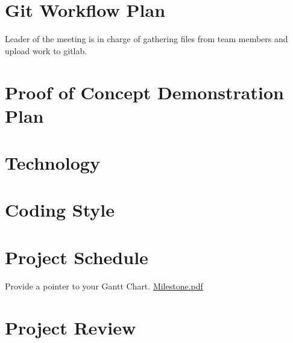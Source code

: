 \documentclass{article}
\begin{document}
\section{Git Workflow Plan}
    Leader of the meeting is in charge of gathering files from team members and upload work to gitlab.\\
    \graphicspath{ {./GitWorkFlow.png} } 
\section{Proof of Concept Demonstration Plan}

\section{Technology}

\section{Coding Style}

\section{Project Schedule}

Provide a pointer to your Gantt Chart.
\href{run:./Milestone.pdf}{Milestone.pdf}

\section{Project Review}
\end{document}
